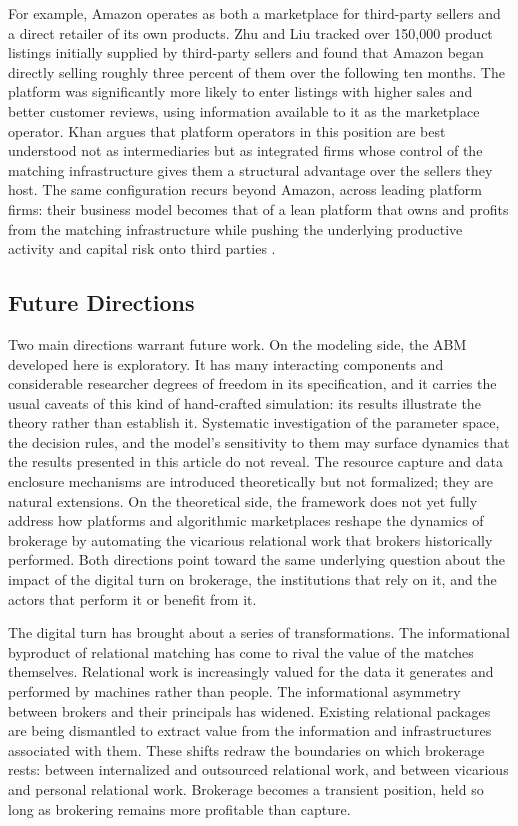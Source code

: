 \documentclass[
]{article}
\begin{document}
For example, Amazon operates as both a marketplace for third-party sellers and a direct retailer of its own products. Zhu and Liu \autocite*{zhuCompetingComplementorsEmpirical} tracked over 150,000 product listings initially supplied by third-party sellers and found that Amazon began directly selling roughly three percent of them over the following ten months. The platform was significantly more likely to enter listings with higher sales and better customer reviews, using information available to it as the marketplace operator. Khan \autocite*{khanAmazonAntitrustParadox2016,khanSeparationPlatformsCommerce2019} argues that platform operators in this position are best understood not as intermediaries but as integrated firms whose control of the matching infrastructure gives them a structural advantage over the sellers they host. The same configuration recurs beyond Amazon, across leading platform firms: their business model becomes that of a lean platform that owns and profits from the matching infrastructure while pushing the underlying productive activity and capital risk onto third parties \autocite{rahmanRisePlatformBusiness2019}.

\subsection{Future Directions}

Two main directions warrant future work. On the modeling side, the ABM developed here is exploratory. It has many interacting components and considerable researcher degrees of freedom in its specification, and it carries the usual caveats of this kind of hand-crafted simulation: its results illustrate the theory rather than establish it. Systematic investigation of the parameter space, the decision rules, and the model's sensitivity to them may surface dynamics that the results presented in this article do not reveal. The resource capture and data enclosure mechanisms are introduced theoretically but not formalized; they are natural extensions. On the theoretical side, the framework does not yet fully address how platforms and algorithmic marketplaces reshape the dynamics of brokerage by automating the vicarious relational work that brokers historically performed. Both directions point toward the same underlying question about the impact of the digital turn on brokerage, the institutions that rely on it, and the actors that perform it or benefit from it.

The digital turn has brought about a series of transformations. The informational byproduct of relational matching has come to rival the value of the matches themselves. Relational work is increasingly valued for the data it generates and performed by machines rather than people. The informational asymmetry between brokers and their principals has widened. Existing relational packages are being dismantled to extract value from the information and infrastructures associated with them. These shifts redraw the boundaries on which brokerage rests: between internalized and outsourced relational work, and between vicarious and personal relational work. Brokerage becomes a transient position, held so long as brokering remains more profitable than capture.

\nocite{borgattiStructuralHolesUnpacking1997,brandesFasterAlgorithmBetweenness2001,everettUnpackingBurtsConstraint2020,freemanSetMeasuresCentrality1977}
\printbibliography[heading=bibnumbered,title={References}]
\end{document}

